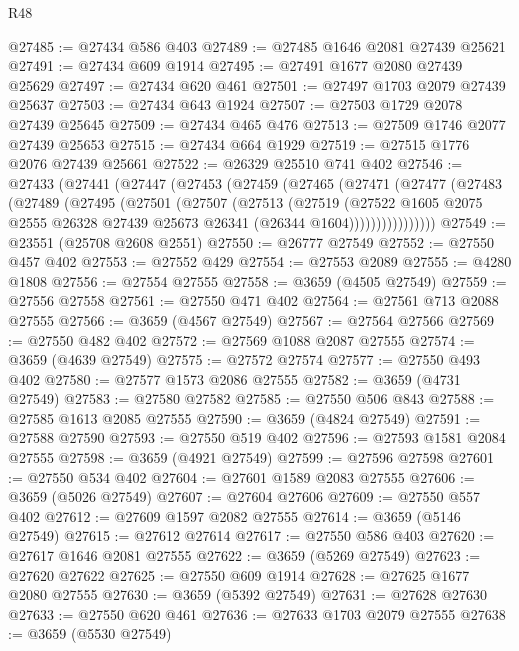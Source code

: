\begin{lexlean}{R48}
\begin{coremodule}
@27485 := @27434 @586 @403
@27489 := @27485 @1646 @2081 @27439 @25621
@27491 := @27434 @609 @1914
@27495 := @27491 @1677 @2080 @27439 @25629
@27497 := @27434 @620 @461
@27501 := @27497 @1703 @2079 @27439 @25637
@27503 := @27434 @643 @1924
@27507 := @27503 @1729 @2078 @27439 @25645
@27509 := @27434 @465 @476
@27513 := @27509 @1746 @2077 @27439 @25653
@27515 := @27434 @664 @1929
@27519 := @27515 @1776 @2076 @27439 @25661
@27522 := @26329 @25510 @741 @402
@27546 := @27433
    (@27441
      (@27447
        (@27453
          (@27459
            (@27465
              (@27471
                (@27477
                  (@27483
                    (@27489
                      (@27495
                        (@27501
                          (@27507
                            (@27513
                              (@27519
                                (@27522
                                  @1605
                                  @2075
                                  @2555
                                  @26328
                                  @27439
                                  @25673
                                  @26341
                                  (@26344 @1604))))))))))))))))
@27549 := @23551 (@25708 @2608 @2551)
@27550 := @26777 @27549
@27552 := @27550 @457 @402
@27553 := @27552 @429
@27554 := @27553 @2089
@27555 := @4280 @1808
@27556 := @27554 @27555
@27558 := @3659 (@4505 @27549)
@27559 := @27556 @27558
@27561 := @27550 @471 @402
@27564 := @27561 @713 @2088 @27555
@27566 := @3659 (@4567 @27549)
@27567 := @27564 @27566
@27569 := @27550 @482 @402
@27572 := @27569 @1088 @2087 @27555
@27574 := @3659 (@4639 @27549)
@27575 := @27572 @27574
@27577 := @27550 @493 @402
@27580 := @27577 @1573 @2086 @27555
@27582 := @3659 (@4731 @27549)
@27583 := @27580 @27582
@27585 := @27550 @506 @843
@27588 := @27585 @1613 @2085 @27555
@27590 := @3659 (@4824 @27549)
@27591 := @27588 @27590
@27593 := @27550 @519 @402
@27596 := @27593 @1581 @2084 @27555
@27598 := @3659 (@4921 @27549)
@27599 := @27596 @27598
@27601 := @27550 @534 @402
@27604 := @27601 @1589 @2083 @27555
@27606 := @3659 (@5026 @27549)
@27607 := @27604 @27606
@27609 := @27550 @557 @402
@27612 := @27609 @1597 @2082 @27555
@27614 := @3659 (@5146 @27549)
@27615 := @27612 @27614
@27617 := @27550 @586 @403
@27620 := @27617 @1646 @2081 @27555
@27622 := @3659 (@5269 @27549)
@27623 := @27620 @27622
@27625 := @27550 @609 @1914
@27628 := @27625 @1677 @2080 @27555
@27630 := @3659 (@5392 @27549)
@27631 := @27628 @27630
@27633 := @27550 @620 @461
@27636 := @27633 @1703 @2079 @27555
@27638 := @3659 (@5530 @27549)

\end{coremodule}
\end{lexlean}
